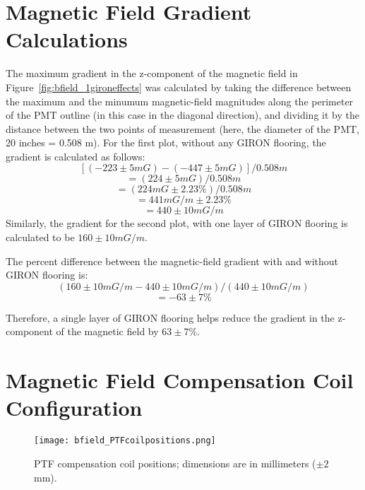 
\appendix

\section{Magnetic Field Gradient Calculations}
\label{Appendix:MagneticFieldGradientCalculations}

The maximum gradient in the z-component of the magnetic field in Figure~\ref{fig:bfield_1gironeffects} was calculated by taking the difference between the maximum and the minumum magnetic-field magnitudes along the perimeter of the PMT outline (in this case in the diagonal direction), and dividing it by the distance between the two points of measurement (here, the diameter of the PMT, 20 inches = 0.508 m).
For the first plot, without any GIRON flooring, the gradient is calculated as follows:
\[[(-223\pm5 mG) - (-447\pm5 mG)]/0.508 m\]
\[=(224\pm5 mG)/0.508 m\]
\[=(224 mG \pm 2.23\%)/0.508 m\]
\[=441 mG/m \pm 2.23\%\]
\[=440 \pm 10 mG/m \]
Similarly, the gradient for the second plot, with one layer of GIRON flooring is calculated to be $ 160 \pm 10 mG/m $.

The percent difference between the magnetic-field gradient with and without GIRON flooring is:
\[(160\pm10 mG/m - 440\pm10 mG/m)/(440\pm10 mG/m)\]
\[=-63\pm7\%\]

Therefore, a single layer of GIRON flooring helps reduce the gradient in the z-component of the magnetic field by $ 63\pm7\% $.

\section{Magnetic Field Compensation Coil Configuration}
\label{Appendix:CoilPositions}
%
\begin{figure}[h]
  \begin{center}
  \texttt{[image: bfield\_PTFcoilpositions.png]}
  \caption{PTF compensation coil positions; dimensions are in millimeters ($\pm2$mm).}
  \label{fig:coils}
  \end{center}
\end{figure}
%
